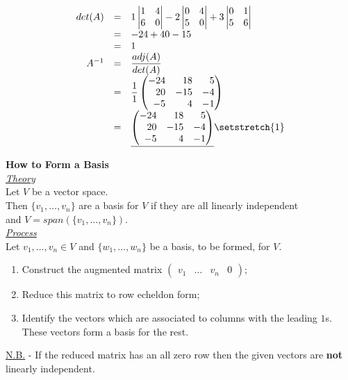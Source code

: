 \documentclass[11pt,a4paper]{article}
\begin{document}
\[\begin{array}{rcl}
  det(A) &=& 1\begin{vmatrix} 1 & 4 \\ 6 & 0\end{vmatrix} -2\begin{vmatrix}0 & 4 \\ 5 & 0 \end{vmatrix} +3\begin{vmatrix}0&1\\5&6 \end{vmatrix}\\
  &=& -24+40-15\\
  &=& 1\\
  A^{-1} &=& \displaystyle{\frac{adj(A)}{det(A)}}\\
  &=& \displaystyle{\frac{1}{1}\begin{pmatrix*}[r] -24 & 18 & 5 \\ 20 & -15 & -4 \\ -5 & 4 & -1 \end{pmatrix*}}\\
  &=& \underline{\begin{pmatrix*}[r] -24 & 18 & 5 \\ 20 & -15 & -4 \\ -5 & 4 & -1 \end{pmatrix*}}
\setstretch{1}\end{array}\]

\textbf{How to Form a Basis}\\

\underline{\textit{Theory}}\\
Let $V$ be a vector space.\\
Then $\{ v_1, \dots, v_n\}$ are a basis for $V$ if they are all linearly independent\\ and $V = span(\{v_1, \dots, v_n\})$.\\

\underline{\textit{Process}}\\
Let $v_1, \dots , v_n \in V$ and $\{ w_1, \dots , w_n\}$ be a basis, to be formed, for $V$.
\begin{enumerate}[label=\roman*)]
  \itemsep0em
  \item Construct the augmented matrix $\begin{pmatrix} v_1 & \dots & v_n & 0 \end{pmatrix}$;
  \item Reduce this matrix to row echeldon form;
  \item Identify the vectors which are associated to columns with the leading $1$s. These vectors form a basis for the rest.
\end{enumerate}
\underline{N.B.} - If the reduced matrix has an all zero row then the given vectors are \textbf{not} linearly independent.
\end{document}
